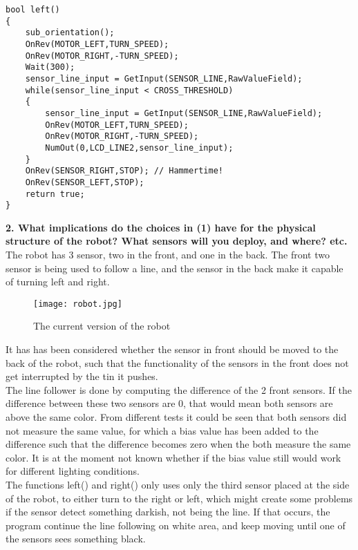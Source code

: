 \documentclass[10pt,a4paper]{article}
\begin{document}
     
\begin{lstlisting}
bool left()
{
    sub_orientation();
    OnRev(MOTOR_LEFT,TURN_SPEED);
    OnRev(MOTOR_RIGHT,-TURN_SPEED);
    Wait(300);  
    sensor_line_input = GetInput(SENSOR_LINE,RawValueField);
    while(sensor_line_input < CROSS_THRESHOLD)
    {       
        sensor_line_input = GetInput(SENSOR_LINE,RawValueField);
        OnRev(MOTOR_LEFT,TURN_SPEED);
        OnRev(MOTOR_RIGHT,-TURN_SPEED);        
        NumOut(0,LCD_LINE2,sensor_line_input);
    }  
    OnRev(SENSOR_RIGHT,STOP); // Hammertime!
    OnRev(SENSOR_LEFT,STOP);  
    return true;
}
\end{lstlisting}
    
     
   \textbf{2.  What implications do the choices in (1) have for the physical structure of the
     robot?  What sensors will you deploy, and where?  etc.}\\


The robot has 3 sensor,  two in the front, and one in the back.  The front two sensor is being used to follow a line, and the sensor in the back make it capable of turning left and right. 
	\begin{figure}[H]
	\begin{center}
    \texttt{[image: robot.jpg]}
  \end{center}
  \caption{The current version of the robot}
\end{figure}   			

It has has been considered  whether the sensor in front should be moved to the back of the robot, such that the functionality of the sensors in the front does not get interrupted by the tin it pushes. \\


The line follower is done by computing the difference of the 2 front sensors.  If the difference between these two sensors are 0, that would mean both sensors are above the same color.    From different tests it could be seen that both sensors did not measure the same value, for which a bias value has been added to the difference such that the difference becomes zero when the both measure the same color.  It is at the moment not known whether if the bias value still would work for different lighting conditions.\\

The functions left() and right() only uses only the third sensor placed at the side of the robot, to either turn to the right or left,  which might create some problems if the sensor detect something darkish, not being the line.  If that occurs, the program continue the line following on white area, and keep moving until one of the sensors sees something black.\\\\
 
\end{document}
